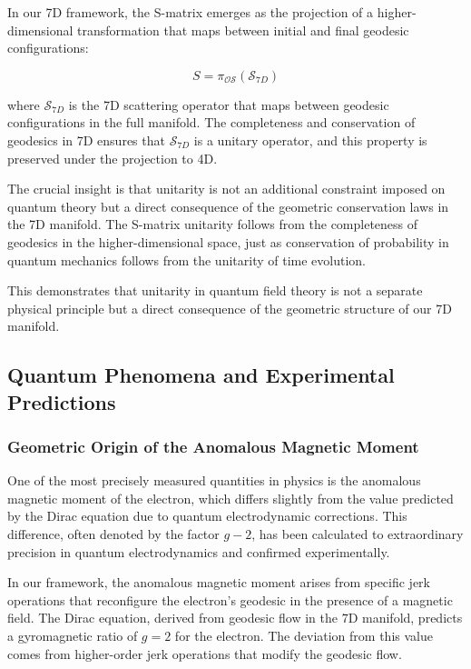 \documentclass{article}
\begin{document}
In our 7D framework, the S-matrix emerges as the projection of a higher-dimensional transformation that maps between initial and final geodesic configurations:

\begin{equation}
S = \pi_{\mathcal{OS}}(\mathcal{S}_{7D})
\end{equation}

where $\mathcal{S}_{7D}$ is the 7D scattering operator that maps between geodesic configurations in the full manifold. The completeness and conservation of geodesics in 7D ensures that $\mathcal{S}_{7D}$ is a unitary operator, and this property is preserved under the projection to 4D.

The crucial insight is that unitarity is not an additional constraint imposed on quantum theory but a direct consequence of the geometric conservation laws in the 7D manifold. The S-matrix unitarity follows from the completeness of geodesics in the higher-dimensional space, just as conservation of probability in quantum mechanics follows from the unitarity of time evolution.

This demonstrates that unitarity in quantum field theory is not a separate physical principle but a direct consequence of the geometric structure of our 7D manifold.

\subsection{Quantum Phenomena and Experimental Predictions}

\subsubsection{Geometric Origin of the Anomalous Magnetic Moment}

One of the most precisely measured quantities in physics is the anomalous magnetic moment of the electron, which differs slightly from the value predicted by the Dirac equation due to quantum electrodynamic corrections. This difference, often denoted by the factor $g - 2$, has been calculated to extraordinary precision in quantum electrodynamics and confirmed experimentally.

In our framework, the anomalous magnetic moment arises from specific jerk operations that reconfigure the electron's geodesic in the presence of a magnetic field. The Dirac equation, derived from geodesic flow in the 7D manifold, predicts a gyromagnetic ratio of $g = 2$ for the electron. The deviation from this value comes from higher-order jerk operations that modify the geodesic flow.
\end{document}
